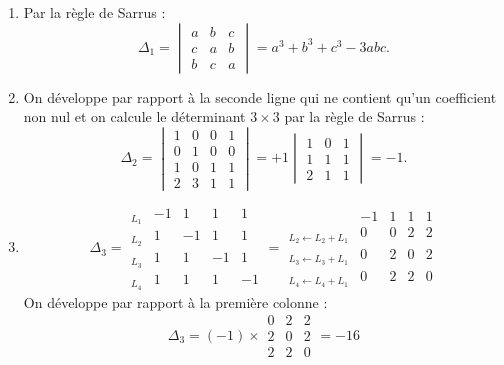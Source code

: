 \documentclass[11pt,a4paper]{article}
\begin{document}
\begin{enumerate}
  \item Par la règle de Sarrus :
$$\Delta_1 = \begin{vmatrix}
a&b&c\\c&a&b\\b&c&a
\end{vmatrix} 
= a^3+b^3+c^3-3abc.$$

  \item On développe par rapport à la seconde ligne qui ne contient qu'un coefficient non nul et on calcule le déterminant
$3\times 3$ par la règle de Sarrus :
$$\Delta_2 = \begin{vmatrix}
1&0&0&1 \\ 0&1&0&0 \\ 1&0&1&1 \\ 2&3&1&1
\end{vmatrix}
= +1 \begin{vmatrix}
1&0&1 \\ 1&1&1 \\ 2&1&1
\end{vmatrix}
= -1.$$

  \item
$$\Delta_3 = 
\begin{array}{l|cccc|} 
_{L_1} & -1 & 1 & 1 & 1 \\ _{L_2} & 1 & -1 & 1 & 1\\ _{L_3} & 1 & 1 & -1& 1\\ _{L_4} & 1 & 1& 1&-1
\end{array}
= \begin{array}{l|cccc|} 
 & -1 & 1 & 1 & 1 \\ _{L_2\leftarrow L_2+L_1} & 0 & 0 & 2 & 2\\
 _{L_3\leftarrow L_3+L_1} & 0 & 2 & 0 & 2 \\  _{L_4\leftarrow L_4+L_1} &0 & 2 & 2 & 0
\end{array}
$$
On développe par rapport à la première colonne :
$$\Delta_3 = (-1) \times \begin{array}{|ccc|} 
  0 & 2 & 2\\  2 & 0 & 2 \\  2 & 2 & 0
\end{array} = -16$$


\end{enumerate}
\end{document}
